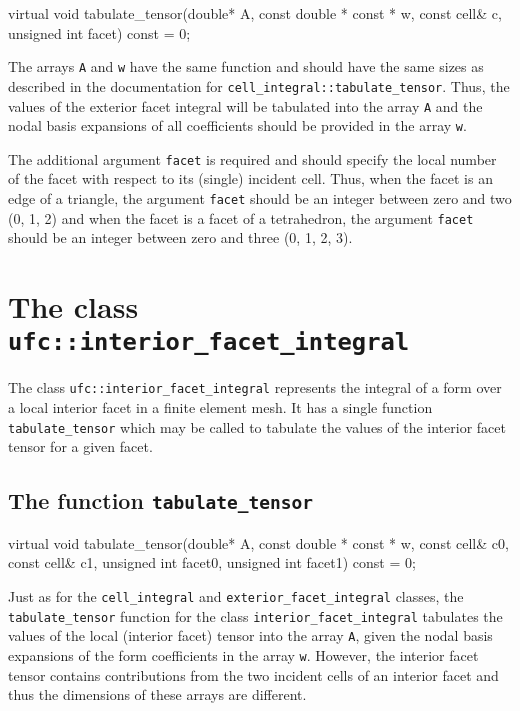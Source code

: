 \begin{code}
virtual void tabulate_tensor(double* A,
                             const double * const * w,
                             const cell& c,
                             unsigned int facet) const = 0;
\end{code}

The arrays \texttt{A} and \texttt{w} have the same function and should
have the same sizes as described in the documentation for
\texttt{cell\_integral::tabulate\_tensor}. Thus, the values of the
exterior facet integral will be tabulated into the array \texttt{A}
and the nodal basis expansions of all coefficients should be provided
in the array \texttt{w}.

The additional argument \texttt{facet} is required and should specify
the local number of the facet with respect to its (single) incident
cell. Thus, when the facet is an edge of a triangle, the argument
\texttt{facet} should be an integer between zero and two (0, 1, 2) and
when the facet is a facet of a tetrahedron, the argument
\texttt{facet} should be an integer between zero and three (0, 1, 2,
3).

\section{The class \texttt{ufc::interior\_facet\_integral}}

The class \texttt{ufc::interior\_facet\_integral} represents the
integral of a form over a local interior facet in a finite element
mesh. It has a single function \texttt{tabulate\_tensor} which may be
called to tabulate the values of the interior facet tensor for a given
facet.

\subsection{The function \texttt{tabulate\_tensor}}

\begin{code}
virtual void tabulate_tensor(double* A,
                             const double * const * w,
                             const cell& c0,
                             const cell& c1,
                             unsigned int facet0,
                             unsigned int facet1) const = 0;
\end{code}

Just as for the \texttt{cell\_integral} and
\texttt{exterior\_facet\_integral} classes, the
\texttt{tabulate\_tensor} function for the class
\texttt{interior\_facet\_integral} tabulates the values of the local
(interior facet) tensor into the array \texttt{A}, given the nodal
basis expansions of the form coefficients in the array \texttt{w}.
However, the interior facet tensor contains contributions from the two
incident cells of an interior facet and thus the dimensions of these
arrays are different.

